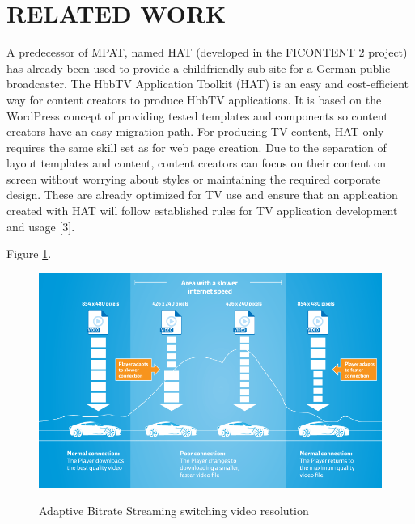 \section{\textbf{RELATED WORK}}\label{sec:RELATED WORK}

A predecessor of MPAT, named HAT (developed in the FICONTENT
2 project) has already been used to provide a childfriendly
sub-site for a German public broadcaster. The HbbTV
Application Toolkit (HAT) is an easy and cost-efficient way
for content creators to produce HbbTV applications. It is based
on the WordPress concept of providing tested templates and
components so content creators have an easy migration path.
For producing TV content, HAT only requires the same skill
set as for web page creation. Due to the separation of layout
templates and content, content creators can focus on their
content on screen without worrying about styles or maintaining
the required corporate design. These are already optimized for
TV use and ensure that an application created with HAT will
follow established rules for TV application development and
usage [3].
















 Figure \ref{fig:abs}.

\begin{figure}[!ht]
	\centering
\includegraphics[scale=0.29]{figures/abs.png}\\
	\caption{Adaptive Bitrate Streaming switching video resolution \cite{abs}}
	\label{fig:abs}
\end{figure}

